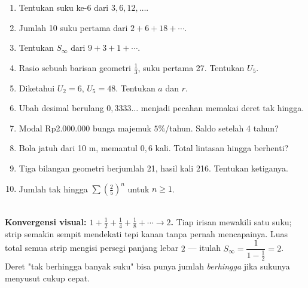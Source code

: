 \documentclass[11pt,a4paper]{report}
\theoremstyle{gaya}
\begin{document}
\begin{latihan}
\begin{enumerate}[leftmargin=*]
  \item Tentukan suku ke-6 dari $3, 6, 12, \dots$.
  \item Jumlah 10 suku pertama dari $2 + 6 + 18 + \cdots$.
  \item Tentukan $S_\infty$ dari $9+3+1+\cdots$.
  \item Rasio sebuah barisan geometri $\tfrac13$, suku pertama 27. Tentukan $U_5$.
  \item Diketahui $U_2=6$, $U_5=48$. Tentukan $a$ dan $r$.
  \item Ubah desimal berulang $0{,}3333\ldots$ menjadi pecahan memakai deret tak hingga.
  \item Modal Rp2.000.000 bunga majemuk $5\%$/tahun. Saldo setelah 4 tahun?
  \item Bola jatuh dari 10 m, memantul $0{,}6$ kali. Total lintasan hingga berhenti?
  \item Tiga bilangan geometri berjumlah 21, hasil kali 216. Tentukan ketiganya.
  \item Jumlah tak hingga $\sum (\tfrac25)^n$ untuk $n\ge 1$.
\end{enumerate}
\end{latihan}

\begin{center}
\\[5pt]
\small\textbf{Konvergensi visual: $1+\tfrac{1}{2}+\tfrac{1}{4}+\tfrac{1}{8}+\cdots\to 2$.} Tiap irisan mewakili satu suku; strip semakin sempit mendekati tepi kanan tanpa pernah mencapainya. Luas total semua strip mengisi persegi panjang lebar $2$ --- itulah $S_\infty=\dfrac{1}{1-\frac12}=2$. Deret "tak berhingga banyak suku" bisa punya jumlah \emph{berhingga} jika sukunya menyusut cukup cepat.
\end{center}
\end{document}
